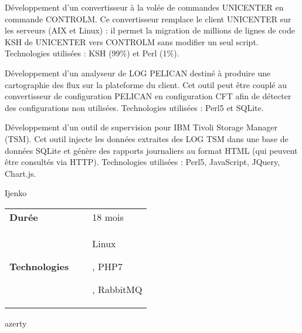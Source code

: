 \documentclass{cv}
\newlength{\hlengthCompanySection}
\newlength{\vlengthSectionTitleContent}
\newcommand{\fontTechnoDef}{\setmainfont[Ligatures=TeX]{Ubuntu Mono}}
\newcommand{\technoBox}[1]{\xtechnoBox{\fontTechno{#1}}}
\newcommand{\xvPerl}[1]{\technoBox{Perl#1}}
\newenvironment{sectionComponent}{%
   \vspace{\vlengthSectionTitleContent}\par%
}{%
   \par%
}%
\newcommand{\realisationHeader}[2]{%
   \vspace{10pt}\par%
   \begin{tcolorbox}[notitle,
                     nobeforeafter, %
                     bottomrule=0pt,
                     toprule=0pt,
                     leftrule=2pt,
                     rightrule=0pt,
                     top=0pt,
                     bottom=0pt,
                     halign=left,
                     left=0pt,
                     valign=center,
                     width=\textwidth,
                     colback=white]%
      \begin{packed_tabular}%
         \begin{tabular}{lll}%
            \textbf{Durée}        & ~ & #1 \\
            \textbf{Technologies} & ~ & #2 \\
         \end{tabular}%
      \end{packed_tabular}%
   \end{tcolorbox}%
   \par%
}%
\newcommand{\sectionCompany}[1]{%
   \vspace{\vlengthSectionTitleContent}\par%
   \hspace{\hlengthCompanySection}\begin{tcolorbox}[notitle,
                      nobeforeafter, %
                      bottomrule=2pt,
                      toprule=0pt,
                      leftrule=0pt,
                      rightrule=0pt,
                      top=0pt,
                      bottom=0pt,
                      halign=left,
                      left=0pt,
                      valign=center,
                      colback={colorCompanySection},
                      width=\textwidth-\hlengthCompanySection]%
       #1%
   \end{tcolorbox}%
   \par%
}%
\newenvironment{technoEnv}{%
   \fontTechnoDef
}{}
\newcommand{\techno}[1]{%
   \begin{technoEnv}%
   #1%
   \end{technoEnv}\par%
}
\newenvironment{packed_tabular}{
   \setlength{\tabcolsep}{0pt}
}{}
\newenvironment{realisationEnv}{
   \setlength{\parskip}{1em}
}{%
   \par%
}
\begin{document}
\begin{sectionComponent}
\begin{realisationEnv}
         Développement d'un convertisseur à la volée de commandes UNICENTER en commande CONTROLM. Ce convertisseur remplace le client UNICENTER sur
         les serveurs (AIX et Linux) : il permet la migration de millions de lignes de code KSH de UNICENTER vers CONTROLM sans modifier un seul script.
         Technologies utilisées : KSH (99\%) et Perl (1\%).
   
         Développement d'un analyseur de LOG PELICAN destiné à produire une cartographie des flux sur la plateforme du client. Cet outil peut être
         couplé au convertisseur de configuration PELICAN en configuration CFT afin de détecter des configurations non utilisées. Technologies
         utilisées : Perl5 et SQLite.
   
         Développement d'un outil de supervision pour IBM Tivoli Storage Manager (TSM). Cet outil injecte les données extraites des LOG TSM dans une
         base de données SQLite et génère des rapports journaliers au format HTML (qui peuvent être consultés via HTTP). Technologies utilisées :
         Perl5, JavaScript, JQuery, Chart.js.
   
       \end{realisationEnv}
   \end{sectionComponent}

   \begin{sectionComponent}
      \sectionCompany{Ijenko}

      \realisationHeader{18 mois}{\techno{Linux}, \techno{PHP7}, \techno{RabbitMQ}}

      \begin{realisationEnv}
         \xvPerl{5} azerty
      \end{realisationEnv}

   \end{sectionComponent}
\end{document}
